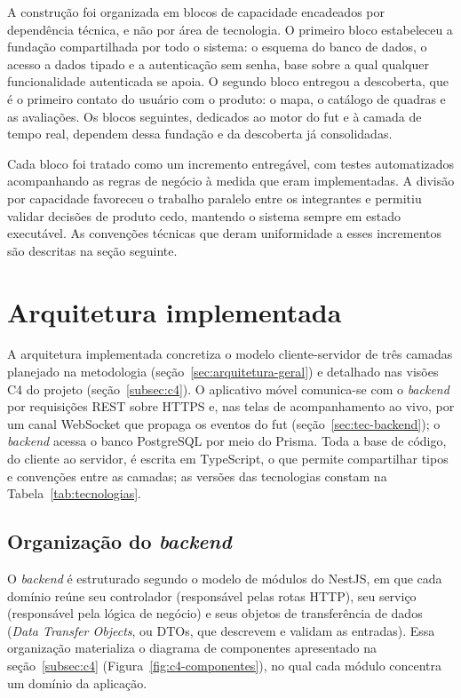     A construção foi organizada em blocos de capacidade encadeados por dependência técnica, e não por área de tecnologia. O primeiro bloco estabeleceu a fundação compartilhada por todo o sistema: o esquema do banco de dados, o acesso a dados tipado e a autenticação sem senha, base sobre a qual qualquer funcionalidade autenticada se apoia. O segundo bloco entregou a descoberta, que é o primeiro contato do usuário com o produto: o mapa, o catálogo de quadras e as avaliações. Os blocos seguintes, dedicados ao motor do fut e à camada de tempo real, dependem dessa fundação e da descoberta já consolidadas.

    Cada bloco foi tratado como um incremento entregável, com testes automatizados acompanhando as regras de negócio à medida que eram implementadas. A divisão por capacidade favoreceu o trabalho paralelo entre os integrantes e permitiu validar decisões de produto cedo, mantendo o sistema sempre em estado executável. As convenções técnicas que deram uniformidade a esses incrementos são descritas na seção seguinte.

\section{Arquitetura implementada}
  \label{sec:dev-arquitetura}

    A arquitetura implementada concretiza o modelo cliente-servidor de três camadas planejado na metodologia (seção~\ref{sec:arquitetura-geral}) e detalhado nas visões C4 do projeto (seção~\ref{subsec:c4}). O aplicativo móvel comunica-se com o \textit{backend} por requisições REST sobre HTTPS e, nas telas de acompanhamento ao vivo, por um canal WebSocket que propaga os eventos do fut (seção~\ref{sec:tec-backend}); o \textit{backend} acessa o banco PostgreSQL por meio do Prisma. Toda a base de código, do cliente ao servidor, é escrita em TypeScript, o que permite compartilhar tipos e convenções entre as camadas; as versões das tecnologias constam na Tabela~\ref{tab:tecnologias}.

    \subsection{Organização do \textit{backend}}
      O \textit{backend} é estruturado segundo o modelo de módulos do NestJS, em que cada domínio reúne seu controlador (responsável pelas rotas HTTP), seu serviço (responsável pela lógica de negócio) e seus objetos de transferência de dados (\textit{Data Transfer Objects}, ou DTOs, que descrevem e validam as entradas). Essa organização materializa o diagrama de componentes apresentado na seção~\ref{subsec:c4} (Figura~\ref{fig:c4-componentes}), no qual cada módulo concentra um domínio da aplicação.

